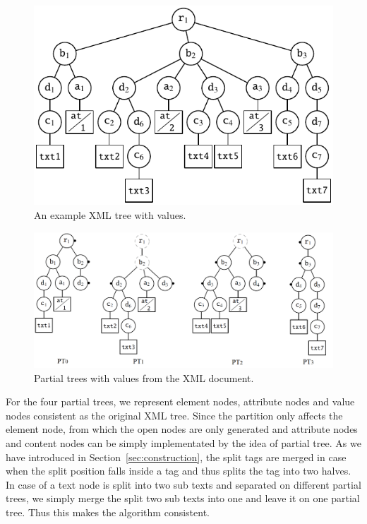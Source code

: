 \begin{figure}[t]
	\centering
	\includegraphics[scale=1.1]{partialtree/figures/bfstree.pdf}
	\caption{An example XML tree with values.}
    \label{fig:bfstree}
\end{figure}

\begin{figure}[t]
	\centering
	\includegraphics[scale=0.26]{partialtree/figures/bfstrees.png}
	\caption{Partial trees with values from the XML document.}
	\label{fig:bfspartialtree}
\end{figure}

For the four partial trees, we represent element nodes, attribute nodes and
value nodes consistent as the original XML tree. Since the partition only
affects the element node, from which the open nodes are only generated and
attribute nodes and content nodes can be simply implementated by the idea of
partial tree. As we have introduced in Section~\ref{sec:construction}, the split
tags are merged in case when the split position falls inside a tag and thus
splits the tag into two halves. In case of a text node is split into two sub
texts and separated on different partial trees, we simply merge the split two
sub texts into one and leave it on one partial tree. Thus this makes the
algorithm consistent.


